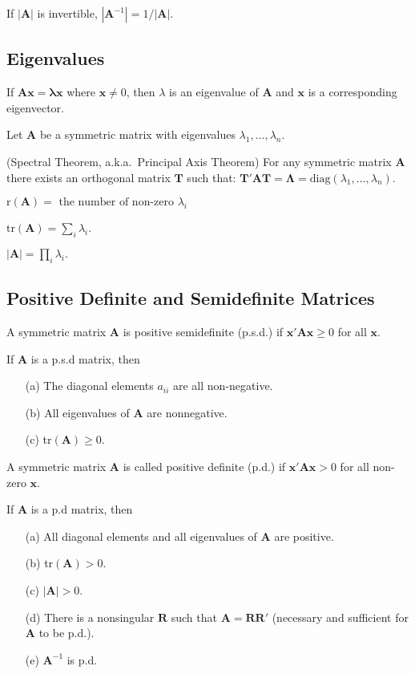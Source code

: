 \bstheo
If $ |\mathbf{A}|$ is invertible, $ |\mathbf{A}^{-1}| = {1}/{ |\mathbf{A}|}$.
\estheo

\newpage
\subsection{Eigenvalues}

\bdefi
If $\mathbf{Ax=\lambda x}$ where $\mathbf x\neq 0$, then $\lambda$ is
an eigenvalue of $\mathbf A$ and $\mathbf x$ is a corresponding
eigenvector.
\edefi

Let $\mathbf A$ be a symmetric matrix with eigenvalues
$\lambda_1,\ldots,\lambda_n$.

\bstheo
(Spectral Theorem, a.k.a.~Principal Axis Theorem)
For any symmetric matrix $\mathbf A$ there exists an orthogonal matrix
$\mathbf T$ such that: $\mathbf{T'AT = \Lambda} = \mathrm{diag}
(\lambda_1,\ldots,\lambda_n)$. 
\estheo

\bstheo
$\mathrm{r}(\mathbf{A})=\mbox{ the number of non-zero } \lambda_i$
\estheo

\bstheo
$\mathrm{tr}(\mathbf{A})=\sum_i \lambda_i$.
\estheo

\bstheo
$|\mathbf{A}|=\prod_i \lambda_i.$
\etheo


\subsection{Positive Definite and Semidefinite Matrices}

\bdefi
A symmetric matrix $\mathbf A$ is positive semidefinite (p.s.d.) if
$\mathbf{x'Ax} \geq 0$ for all $\mathbf x$.
\edefi

\bstheo
If  $\mathbf A$ is a p.s.d matrix, then
\begin{itemize}
\item[(a)] The diagonal elements $a_{ii}$ are all non-negative.
\item[(b)] All eigenvalues of $\mathbf A$ are nonnegative.
\item[(c)] tr$(\mathbf{A})\geq 0$.
\end{itemize}
\estheo

\newpage
\bdefi 
A symmetric matrix $\mathbf A$ is called positive definite (p.d.) if
$\mathbf{x'Ax} > 0$ for all non-zero $\mathbf x$.
\edefi



\bstheo
If  $\mathbf A$ is a p.d matrix, then
\begin{itemize}
\item[(a)] All diagonal elements and all eigenvalues of $\mathbf A$ are positive.
\item[(b)] tr$(\mathbf{A})> 0$.
\item[(c)] $|\mathbf{A}|>0$.
\item[(d)] There is a nonsingular $\mathbf R$ such that $\mathbf{A=RR'}$
(necessary and sufficient for $\mathbf A$ to be p.d.).
\item[(e)] $\mathbf{A}^{-1}$ is p.d.
\end{itemize}
\etheo


